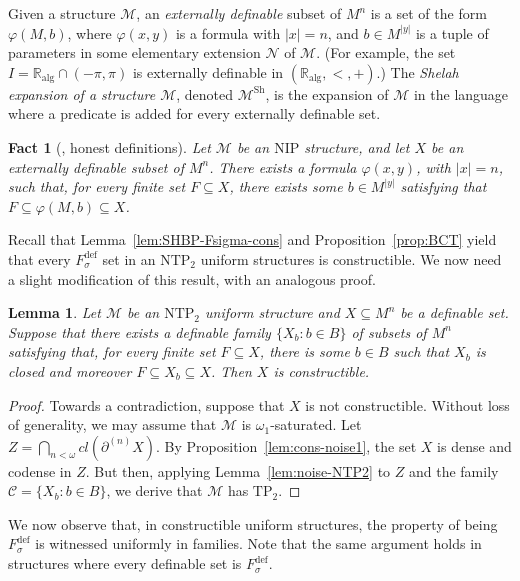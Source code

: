 \documentclass[12pt]{article}
\newcommand{\Cc}{\mathcal{C}}
\newcommand{\Mm}{\mathcal{M}}
\newcommand{\Nn}{\mathcal{N}}
\newcommand{\dF}{\ensuremath{F_\sigma^{\text{def}}}}
\newcommand{\Ralg}{\mathbb{R}_{\text{alg}}}
\newcommand{\Msh}{\Mm^{\text{Sh}}}
\newcommand{\NIP}{\ensuremath{\mathrm{NIP}}}
\newcommand{\NTP}{\ensuremath{\mathrm{NTP}_2}}
\newcommand{\TP}{\ensuremath{\mathrm{TP}_2}}
\newtheorem{lemma}[theorem]{Lemma}
\newtheorem{fact}[theorem]{Fact}
\theoremstyle{definition}
\theoremstyle{remark}
\begin{document}
Given a structure $\Mm$, an \emph{externally definable} subset of $M^n$ is a set of the form $\varphi(M,b)$, where $\varphi(x,y)$ is a formula with $|x|=n$, and $b\in M^{|y|}$ is a tuple of parameters in some elementary extension $\Nn$ of $\Mm$. (For example, the set $I=\Ralg \cap (-\pi, \pi)$ is externally definable in $(\Ralg, <, +)$.)
The \emph{Shelah expansion of a structure $\Mm$}, denoted $\Msh$, is the expansion of $\Mm$ in the language where a predicate is added for every externally definable set.

\begin{fact}[\cite{simon:guide-NIP}, honest definitions] \label{honest-definitions}
Let $\Mm$ be an $\NIP$ structure, and let $X$ be an externally definable subset of $M^n$. There exists a formula $\varphi(x,y)$, with $|x|=n$, such that, for every finite set $F\subseteq X$, there exists some $b\in M^{|y|}$ satisfying that $F\subseteq \varphi(M,b) \subseteq X$. 
\end{fact}

Recall that Lemma~\ref{lem:SHBP-Fsigma-cons} and Proposition~\ref{prop:BCT} yield that every $\dF$ set in an $\NTP$ uniform structures is constructible. We now need a slight modification of this result, with an analogous proof.

\begin{lemma}\label{lem:NIP-Fsigma}
Let $\Mm$ be an $\NTP$ uniform structure and $X\subseteq M^n$ be a definable set. Suppose that there exists a definable family $\{ X_b : b\in B\}$ of subsets of $M^n$ satisfying that, for every finite set $F\subseteq X$, there is some $b\in B$ such that $X_b$ is closed and moreover $F\subseteq X_b \subseteq X$. Then $X$ is constructible. 
\end{lemma}
\begin{proof}
Towards a contradiction, suppose that $X$ is not constructible. Without loss of generality, we may assume that $\Mm$ is $\omega_1$-saturated. Let $Z=\bigcap_{n<\omega} cl(\partial^{(n)} X)$. By Proposition~\ref{lem:cons-noise1}, the set $X$ is dense and codense in $Z$. But then, applying Lemma~\ref{lem:noise-NTP2} to $Z$ and the family $\Cc=\{ X_b : b\in B\}$, we derive that $\Mm$ has $\TP$. 
\end{proof}

We now observe that, in constructible uniform structures, the property of being $\dF$ is witnessed uniformly in families. Note that the same argument holds in structures where every definable set is $\dF$.
\end{document}
